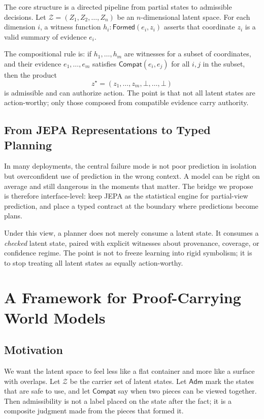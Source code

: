 \documentclass[12pt, a4paper]{article}
\begin{document}
The core structure is a directed pipeline from partial states to admissible
decisions. Let $\mathcal{Z} = (Z_1, Z_2, \ldots, Z_n)$ be an $n$-dimensional
latent space. For each dimension $i$, a witness function $h_i : \mathsf{Formed}(e_i,
z_i)$ asserts that coordinate $z_i$ is a valid summary of evidence $e_i$.

The compositional rule is: if $h_1, \ldots, h_m$ are witnesses for a subset of
coordinates, and their evidence $e_1, \ldots, e_m$ satisfies $\mathsf{Compat}(e_i,
e_j)$ for all $i, j$ in the subset, then the product
\[
  z^{\star} = (z_1, \ldots, z_m, \bot, \ldots, \bot)
\]
is admissible and can authorize action. The point is that not all latent states
are action-worthy; only those composed from compatible evidence carry authority.

\subsection{From JEPA Representations to Typed Planning}

In many deployments, the central failure mode is not poor prediction in isolation
but overconfident use of prediction in the wrong context. A model can be right on
average and still dangerous in the moments that matter. The bridge we propose is
therefore interface-level: keep JEPA as the statistical engine for partial-view
prediction, and place a typed contract at the boundary where predictions become
plans.

Under this view, a planner does not merely consume a latent state. It consumes a
\emph{checked} latent state, paired with explicit witnesses about provenance,
coverage, or confidence regime. The point is not to freeze learning into rigid
symbolism; it is to stop treating all latent states as equally action-worthy.

\section{A Framework for Proof-Carrying World Models}
\label{sec:framework}

\subsection{Motivation}

We want the latent space to feel less like a flat container and more like a
surface with overlaps. Let $\mathcal{Z}$ be the carrier set of latent states.
Let $\mathsf{Adm}$ mark the states that are safe to use, and let
$\mathsf{Compat}$ say when two pieces can be viewed together. Then admissibility
is not a label placed on the state after the fact; it is a composite judgment
made from the pieces that formed it.
\end{document}
